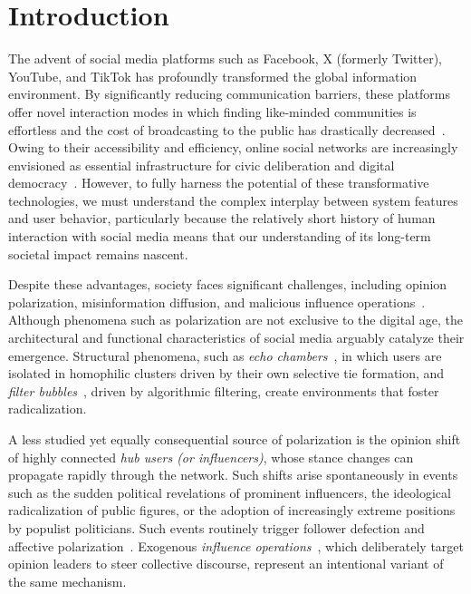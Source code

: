 \documentclass[pdflatex,sn-mathphys-num]{sn-jnl}%
\theoremstyle{thmstyleone}%
\theoremstyle{thmstyletwo}%
\theoremstyle{thmstylethree}%
\begin{document}
\section{Introduction}\label{Intro}
The advent of social media platforms such as Facebook, X (formerly Twitter), YouTube, and TikTok has profoundly transformed the global information environment. By significantly reducing communication barriers, these platforms offer novel interaction modes in which finding like-minded communities is effortless and the cost of broadcasting to the public has drastically decreased~\cite{Cheung2011,Carr2015,Nyhan2023}. Owing to their accessibility and efficiency, online social networks are increasingly envisioned as essential infrastructure for civic deliberation and digital democracy~\cite{Smith2021,Tseng2022,Yang2025}. However, to fully harness the potential of these transformative technologies, we must understand the complex interplay between system features and user behavior, particularly because the relatively short history of human interaction with social media means that our understanding of its long-term societal impact remains nascent.
\par


Despite these advantages, society faces significant challenges, including opinion polarization, misinformation diffusion, and malicious influence operations~\cite{Fisher2015,Baccarella2018,Conover2011}. Although phenomena such as polarization are not exclusive to the digital age, the architectural and functional characteristics of social media arguably catalyze their emergence. Structural phenomena, such as \emph{echo chambers}~\cite{Cinelli2021,Sasahara2021}, in which users are isolated in homophilic clusters driven by their own selective tie formation, and \emph{filter bubbles}~\cite{Uthsav2020,Lien2022}, driven by algorithmic filtering, create environments that foster radicalization.

A less studied yet equally consequential source of polarization
is the opinion shift of highly connected \emph{hub users (or influencers)},
whose stance changes can propagate rapidly through the network.
Such shifts arise spontaneously in events such as the sudden political revelations of
prominent influencers, the ideological radicalization of public figures,
or the adoption of increasingly extreme positions by populist politicians.
Such events routinely trigger follower defection and affective polarization~\cite{Flamino2023,Bail2018}.
Exogenous \emph{influence operations}~\cite{Fisher2015,Pascal2016,Golovchenko2020},
which deliberately target opinion leaders to steer collective discourse,
represent an intentional variant of the same mechanism.
\par
\end{document}
